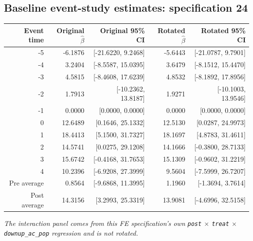 \documentclass[10pt]{article}
\begin{document}
\subsection*{Baseline event-study estimates: specification 24}
\begin{center}
\scriptsize
\begin{tabular}{r rr rr}
\toprule
Event time & Original $\hat\beta$ & Original 95\% CI & Rotated $\hat\beta$ & Rotated 95\% CI \\
\midrule
-5 & -6.1876 & [-21.6220, 9.2468] & -5.6443 & [-21.0787, 9.7901] \\
-4 & 3.2404 & [-8.5587, 15.0395] & 3.6479 & [-8.1512, 15.4470] \\
-3 & 4.5815 & [-8.4608, 17.6239] & 4.8532 & [-8.1892, 17.8956] \\
-2 & 1.7913 & [-10.2362, 13.8187] & 1.9271 & [-10.1003, 13.9546] \\
-1 & 0.0000 & [0.0000, 0.0000] & 0.0000 & [0.0000, 0.0000] \\
0 & 12.6489 & [0.1646, 25.1332] & 12.5130 & [0.0287, 24.9973] \\
1 & 18.4413 & [5.1500, 31.7327] & 18.1697 & [4.8783, 31.4611] \\
2 & 14.5741 & [0.0275, 29.1208] & 14.1666 & [-0.3800, 28.7133] \\
3 & 15.6742 & [-0.4168, 31.7653] & 15.1309 & [-0.9602, 31.2219] \\
4 & 10.2396 & [-6.9208, 27.3999] & 9.5604 & [-7.5999, 26.7207] \\
\midrule
Pre average & 0.8564 & [-9.6868, 11.3995] & 1.1960 & [-1.3694, 3.7614] \\
Post average & 14.3156 & [3.2993, 25.3319] & 13.9081 & [-4.6996, 32.5158] \\
\bottomrule
\end{tabular}
\end{center}
\medskip
\textit{The interaction panel comes from this FE specification's own \texttt{post} $\times$ \texttt{treat} $\times$ \texttt{downup\_ac\_pop} regression and is not rotated.}
\clearpage
\end{document}
